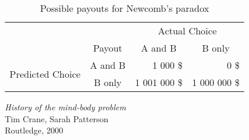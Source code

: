 \documentclass[a4paper]{article}
\begin{document}
		\begin{table}[htbp]
			\centering
			\begin{tabular}{c|c|r|r|}
				\multicolumn{1}{c}{} & \multicolumn{1}{c}{} & \multicolumn{2}{c}{Actual Choice} \\
				\cline{2-4}
				& Payout & \multicolumn{1}{|c|}{A and B} & \multicolumn{1}{|c|}{B only} \\
				\cline{2-4}
				\multirow{2}{*}{Predicted Choice} & A and B & 1 000 \$ & 0 \$ \\
				\cline{2-4}
				& B only & 1 001 000 \$ & 1 000 000 \$ \\
				\cline{2-4}
			\end{tabular}
			\caption{Possible payouts for Newcomb's paradox}
			\label{table:NewcombParadoxPayouts}
		\end{table}

	\begin{thebibliography}{}

			\emph{History of the mind-body problem}\\
			Tim Crane, Sarah Patterson\\
			Routledge, 2000

	\end{thebibliography}
\end{document}
